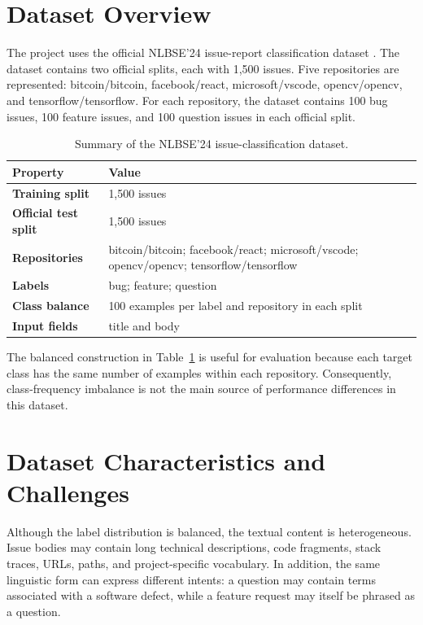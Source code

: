 \section{Dataset Overview}
The project uses the official NLBSE'24 issue-report classification dataset \cite{nlbse2024issue}. The dataset contains two official splits, each with 1,500 issues. Five repositories are represented: bitcoin/bitcoin, facebook/react, microsoft/vscode, opencv/opencv, and tensorflow/tensorflow. For each repository, the dataset contains 100 bug issues, 100 feature issues, and 100 question issues in each official split.

\begin{table}[H]
\centering
\caption{Summary of the NLBSE'24 issue-classification dataset.}
\label{tab:dataset-summary}
\begin{tabularx}{\textwidth}{>{\bfseries}l X}
\toprule
Property & Value \\
\midrule
Training split & 1,500 issues \\
Official test split & 1,500 issues \\
Repositories & bitcoin/bitcoin; facebook/react; microsoft/vscode; opencv/opencv; tensorflow/tensorflow \\
Labels & bug; feature; question \\
Class balance & 100 examples per label and repository in each split \\
Input fields & title and body \\
\bottomrule
\end{tabularx}
\end{table}

The balanced construction in Table~\ref{tab:dataset-summary} is useful for evaluation because each target class has the same number of examples within each repository. Consequently, class-frequency imbalance is not the main source of performance differences in this dataset.

\section{Dataset Characteristics and Challenges}
Although the label distribution is balanced, the textual content is heterogeneous. Issue bodies may contain long technical descriptions, code fragments, stack traces, URLs, paths, and project-specific vocabulary. In addition, the same linguistic form can express different intents: a question may contain terms associated with a software defect, while a feature request may itself be phrased as a question.

